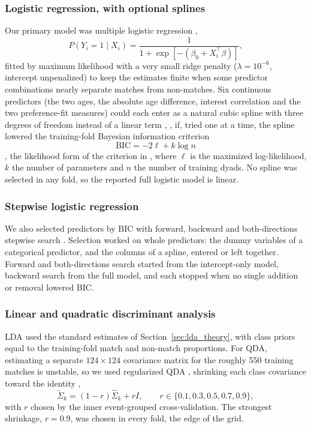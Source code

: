 \subsubsection{Logistic regression, with optional splines}
Our primary model was multiple logistic regression \cite[Equation 4.7, p.~142]{James:2023},
\[
P(Y_i=1\mid X_i)=\frac{1}{1+\exp\left[-(\beta_0+X_i^\top\beta)\right]},
\]
fitted by maximum likelihood with a very small ridge penalty ($\lambda=10^{-6}$, intercept unpenalized) to keep the
estimates finite when some predictor combinations nearly separate matches from non-matches. Six continuous
predictors (the two ages, the absolute age difference, interest correlation and the two preference-fit measures)
could each enter as a natural cubic spline with three degrees of freedom instead of a linear term
\cite[Section 7.4.3, p.~297]{James:2023}, \cite[Section 5.2.1, pp.~144--146]{Hastie:2009},
if, tried one at a time, the spline lowered the training-fold Bayesian information criterion
\[
\mathrm{BIC}=-2\ell+k\log n
\]
\cite[Section 7.7, Eq.~(7.35), p.~233]{Hastie:2009}, the likelihood form of the criterion in
\cite[Section 6.1.3, Equation 6.3, p.~237]{James:2023},
where $\ell$ is the maximized log-likelihood, $k$ the number of parameters and $n$ the number of training dyads. No spline
was selected in any fold, so the reported full logistic model is linear.

\subsubsection{Stepwise logistic regression}
We also selected predictors by BIC with forward, backward and both-directions stepwise search
\cite[Section 6.1.2, pp.~233--235]{James:2023}.
Selection worked on whole predictors: the dummy variables of a categorical predictor, and the columns of a spline,
entered or left together. Forward and both-directions search started from the intercept-only model, backward search
from the full model, and each stopped when no single addition or removal lowered BIC.

\subsubsection{Linear and quadratic discriminant analysis}
LDA used the standard estimates of Section~\ref{sec:lda_theory}, with class priors equal to the training-fold match
and non-match proportions. For QDA, estimating a separate $124\times124$ covariance matrix for the roughly 550 training
matches is unstable, so we used regularized QDA \cite{Friedman:1989}, shrinking each class covariance toward the
identity \cite[Section 4.3.1, Eq.~(4.14), p.~112]{Hastie:2009},
\[
\widetilde\Sigma_k=(1-r)\hat\Sigma_k+rI,\qquad r\in\{0.1,0.3,0.5,0.7,0.9\},
\]
with $r$ chosen by the inner event-grouped cross-validation. The strongest shrinkage, $r=0.9$, was chosen in every
fold, the edge of the grid.


